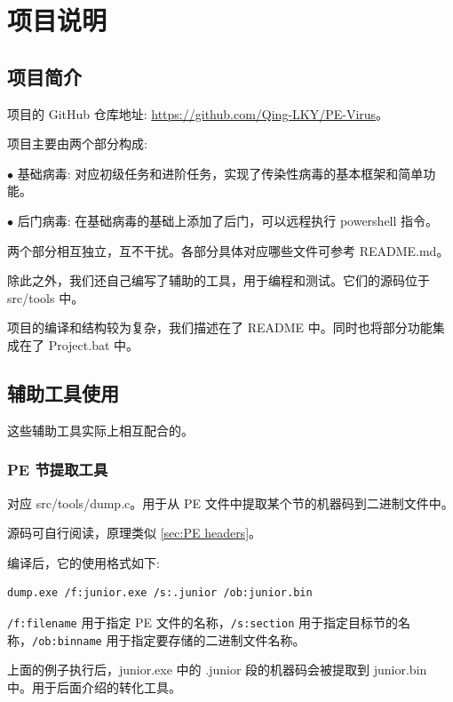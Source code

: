 \documentclass[UTF8]{ctexart}
\begin{document}
    \section{项目说明}
    \subsection{项目简介}

    项目的 GitHub 仓库地址: \href{https://github.com/Qing-LKY/PE-Virus}{https://github.com/Qing-LKY/PE-Virus}。
    
    项目主要由两个部分构成:

    $\bullet$ 基础病毒: 对应初级任务和进阶任务，实现了传染性病毒的基本框架和简单功能。

    $\bullet$ 后门病毒: 在基础病毒的基础上添加了后门，可以远程执行 powershell 指令。

    两个部分相互独立，互不干扰。各部分具体对应哪些文件可参考 README.md。

    除此之外，我们还自己编写了辅助的工具，用于编程和测试。它们的源码位于 src/tools 中。

    项目的编译和结构较为复杂，我们描述在了 README 中。同时也将部分功能集成在了 Project.bat 中。

    \subsection{辅助工具使用}

    这些辅助工具实际上相互配合的。
    
    \subsubsection{PE 节提取工具}
    对应 src/tools/dump.c。用于从 PE 文件中提取某个节的机器码到二进制文件中。

    源码可自行阅读，原理类似 \ref{sec:PE headers}。

    编译后，它的使用格式如下:

    \begin{lstlisting}
dump.exe /f:junior.exe /s:.junior /ob:junior.bin
    \end{lstlisting}

    \verb|/f:filename| 用于指定 PE 文件的名称，\verb|/s:section| 用于指定目标节的名称，\verb|/ob:binname| 用于指定要存储的二进制文件名称。

    上面的例子执行后，junior.exe 中的 .junior 段的机器码会被提取到 junior.bin 中。用于后面介绍的转化工具。
\end{document}
